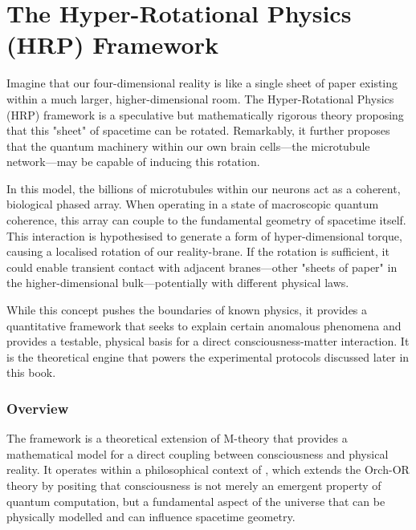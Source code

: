 
\chapter{The Hyper-Rotational Physics (HRP) Framework}
\label{ch:hrp}

\begin{nontechnical}
    Imagine that our four-dimensional reality is like a single sheet of paper existing within a much larger, higher-dimensional room. The Hyper-Rotational Physics (HRP) framework is a speculative but mathematically rigorous theory proposing that this "sheet" of spacetime can be rotated. Remarkably, it further proposes that the quantum machinery within our own brain cells—the microtubule network—may be capable of inducing this rotation.

    In this model, the billions of microtubules within our neurons act as a coherent, biological phased array. When operating in a state of macroscopic quantum coherence, this array can couple to the fundamental geometry of spacetime itself. This interaction is hypothesised to generate a form of hyper-dimensional torque, causing a localised rotation of our reality-brane. If the rotation is sufficient, it could enable transient contact with adjacent branes—other "sheets of paper" in the higher-dimensional bulk—potentially with different physical laws.

    While this concept pushes the boundaries of known physics, it provides a quantitative framework that seeks to explain certain anomalous phenomena and provides a testable, physical basis for a direct consciousness-matter interaction. It is the theoretical engine that powers the experimental protocols discussed later in this book.
\end{nontechnical}

\subsection{Overview}

The  framework is a theoretical extension of M-theory that provides a mathematical model for a direct coupling between consciousness and physical reality. It operates within a philosophical context of , which extends the Orch-OR theory by positing that consciousness is not merely an emergent property of quantum computation, but a fundamental aspect of the universe that can be physically modelled and can influence spacetime geometry.

